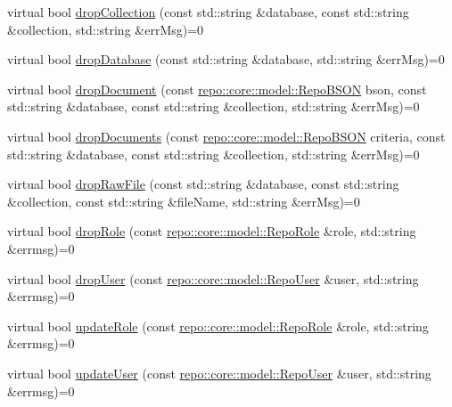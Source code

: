 \begin{DoxyCompactItemize}
\item 
virtual bool \hyperlink{classrepo_1_1core_1_1handler_1_1_abstract_database_handler_ab268b2a7d4e0ae0499d016d3311767e7}{drop\+Collection} (const std\+::string \&database, const std\+::string \&collection, std\+::string \&err\+Msg)=0
\item 
virtual bool \hyperlink{classrepo_1_1core_1_1handler_1_1_abstract_database_handler_ad169812ef62d6d21a02d5545633492c0}{drop\+Database} (const std\+::string \&database, std\+::string \&err\+Msg)=0
\item 
virtual bool \hyperlink{classrepo_1_1core_1_1handler_1_1_abstract_database_handler_a189685c88cbadb3f239829d65d4dcb3b}{drop\+Document} (const \hyperlink{classrepo_1_1core_1_1model_1_1_repo_b_s_o_n}{repo\+::core\+::model\+::\+Repo\+B\+S\+O\+N} bson, const std\+::string \&database, const std\+::string \&collection, std\+::string \&err\+Msg)=0
\item 
virtual bool \hyperlink{classrepo_1_1core_1_1handler_1_1_abstract_database_handler_a8b8cdc64a009b872ece09a4f91cdad0c}{drop\+Documents} (const \hyperlink{classrepo_1_1core_1_1model_1_1_repo_b_s_o_n}{repo\+::core\+::model\+::\+Repo\+B\+S\+O\+N} criteria, const std\+::string \&database, const std\+::string \&collection, std\+::string \&err\+Msg)=0
\item 
virtual bool \hyperlink{classrepo_1_1core_1_1handler_1_1_abstract_database_handler_a4806eb978154c4b4bab85eb99d457318}{drop\+Raw\+File} (const std\+::string \&database, const std\+::string \&collection, const std\+::string \&file\+Name, std\+::string \&err\+Msg)=0
\item 
virtual bool \hyperlink{classrepo_1_1core_1_1handler_1_1_abstract_database_handler_a65822a2183bec303c08008fadb1d17d2}{drop\+Role} (const \hyperlink{classrepo_1_1core_1_1model_1_1_repo_role}{repo\+::core\+::model\+::\+Repo\+Role} \&role, std\+::string \&errmsg)=0
\item 
virtual bool \hyperlink{classrepo_1_1core_1_1handler_1_1_abstract_database_handler_a07bd15002e4c23c138a39d3b47af3882}{drop\+User} (const \hyperlink{classrepo_1_1core_1_1model_1_1_repo_user}{repo\+::core\+::model\+::\+Repo\+User} \&user, std\+::string \&errmsg)=0
\item 
virtual bool \hyperlink{classrepo_1_1core_1_1handler_1_1_abstract_database_handler_a7253300babe9db40658616b9c227c9e7}{update\+Role} (const \hyperlink{classrepo_1_1core_1_1model_1_1_repo_role}{repo\+::core\+::model\+::\+Repo\+Role} \&role, std\+::string \&errmsg)=0
\item 
virtual bool \hyperlink{classrepo_1_1core_1_1handler_1_1_abstract_database_handler_a28b9829e0888e2cb4568f6bb13c95d93}{update\+User} (const \hyperlink{classrepo_1_1core_1_1model_1_1_repo_user}{repo\+::core\+::model\+::\+Repo\+User} \&user, std\+::string \&errmsg)=0

\end{DoxyCompactItemize}
